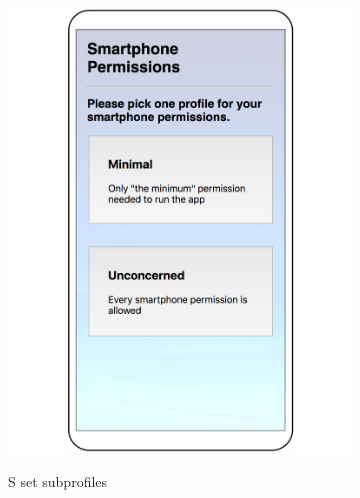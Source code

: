\begin{figure}
	\centering
	\begin{subfigure}[b]{0.22\textheight}
		\includegraphics[width=0.2\textheight]{figures/pickprofile.pdf}
		\label{fig:ppa}
		\caption{S set subprofiles}
	\end{subfigure}
~~
	\begin{subfigure}[b]{0.22\textheight}

\end{subfigure}
\end{figure}
